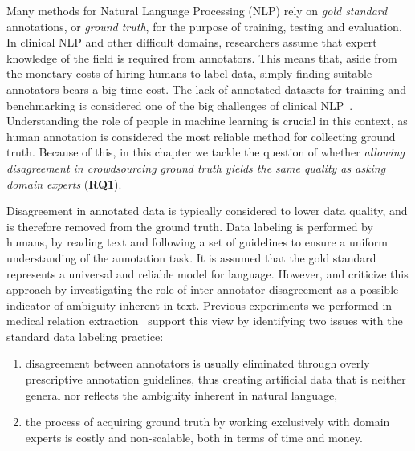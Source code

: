 
Many methods for Natural Language Processing (NLP) rely on \textit{gold standard} annotations, or \textit{ground truth}, for the purpose of training, testing and evaluation. In clinical NLP and other difficult domains, researchers assume that expert knowledge of the field is required from annotators.  This means that, aside from the monetary costs of hiring humans to label data, simply finding suitable annotators bears a big time cost. The lack of annotated datasets for training and benchmarking is considered one of the big challenges of clinical NLP~\cite{chapman2011overcoming}. Understanding the role of people in machine learning is crucial in this context, as human annotation is considered the most reliable method for collecting ground truth. Because of this, in this chapter we tackle the question of whether \textit{allowing disagreement in crowdsourcing ground truth yields the same quality as asking domain experts} (\textbf{RQ1}).

Disagreement in annotated data is typically considered to lower data quality, and is therefore removed from the ground truth. Data labeling is performed by humans, by reading text and following a set of guidelines to ensure a uniform understanding of the annotation task.  It is assumed that the gold standard represents a universal and reliable model for language. However, \citet{schaekermann2016} and \citet{Bayerl2011} criticize this approach by investigating the role of inter-annotator disagreement as a possible indicator of ambiguity inherent in text.  Previous experiments we performed in medical relation extraction~\cite{aroyo2013crowd} support this view by identifying two issues with the standard data labeling practice:

\begin{enumerate}

\item disagreement between annotators is usually eliminated through overly prescriptive annotation guidelines, thus creating artificial data that is neither general nor reflects the ambiguity inherent in natural language,

\item the process of acquiring ground truth by working exclusively with domain experts is costly and non-scalable, both in terms of time and money.

\end{enumerate}

